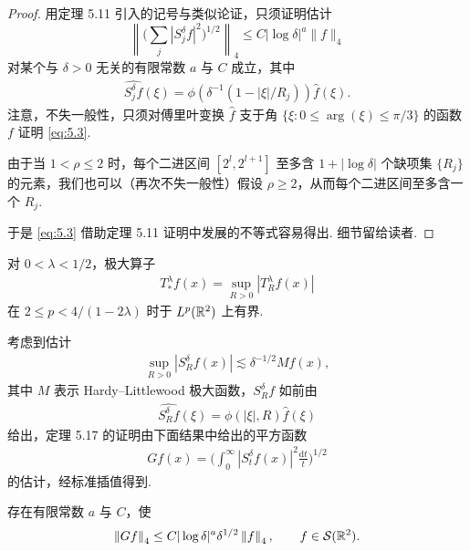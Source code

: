 \begin{proof}
用定理 5.11 引入的记号与类似论证，只须证明估计
\begin{equation}\label{eq:5.3}
  \left\|\Big(\sum_{j}|S_{j}^{\delta}f|^{2}\Big)^{1/2}\right\|_{4}
  \leq C\left|\log\delta\right|^{a}\|f\|_{4}
\end{equation}
对某个与 $\delta > 0$ 无关的有限常数 $a$ 与 $C$ 成立，其中
\begin{align*}
  \widehat{S_{j}^{\delta}f}(\xi)=\phi(\delta^{-1}\left(1-|\xi|/R_{j}\right))\widehat{f}(\xi).
\end{align*}
注意，不失一般性，只须对傅里叶变换 $\widehat{f}$ 支于角 $\{\xi : 0 \leq \arg(\xi) \leq \pi/3\}$ 的函数 $f$ 证明 \eqref{eq:5.3}.

由于当 $1 < \rho \leq 2$ 时，每个二进区间 $[2^l, 2^{l+1}]$ 至多含 $1 + |\log \delta|$ 个缺项集 $\{R_j\}$ 的元素，我们也可以（再次不失一般性）假设 $\rho \geq 2$，从而每个二进区间至多含一个 $R_j$.

于是 \eqref{eq:5.3} 借助定理 5.11 证明中发展的不等式容易得出. 细节留给读者.
\end{proof}

\begin{theorem}\label{thm:5.17}
对 $0 < \lambda < 1/2$，极大算子
\begin{align*}
  T^{\lambda}_{*}f(x)=\sup_{R>0}|T^{\lambda}_{R}f(x)|
\end{align*}
在 $2 \leq p < 4/(1 - 2\lambda)$ 时于 $L^p(\mathbb{R}^2)$ 上有界.
\end{theorem}

考虑到估计
\begin{align*}
  \sup_{R>0}|S_{R}^{\delta}f(x)|\lesssim\delta^{-1/2}M f(x),
\end{align*}
其中 $M$ 表示 Hardy--Littlewood 极大函数，$S_{R}^{\delta}f$ 如前由
\begin{align*}
  \widehat{S_{R}^{\delta}f}(\xi)=\phi(|\xi|,R)\widehat{f}(\xi)
\end{align*}
给出，定理 5.17 的证明由下面结果中给出的平方函数
\begin{align*}
  G f(x)=\Big(\int_{0}^{\infty}|S_{t}^{\delta}f(x)|^{2}\frac{\mathrm{d}t}{t}\Big)^{1/2}
\end{align*}
的估计，经标准插值得到.

\begin{lemma}\label{lem:5.18}
存在有限常数 $a$ 与 $C$，使
\begin{align*}
  \left\|G f\right\|_{4}\leq C|\log\delta|^{a}\delta^{1/2}\left\|f\right\|_{4},\qquad f\in\mathcal{S}(\mathbb{R}^{2}).
\end{align*}
\end{lemma}

